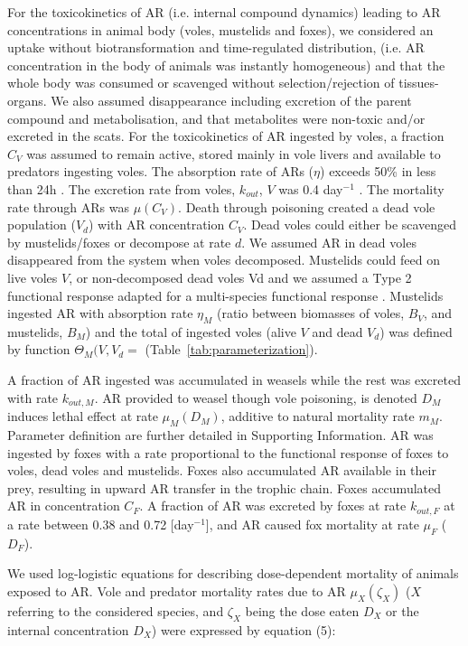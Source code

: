 \documentclass[11pt]{article}
\begin{document}
For the toxicokinetics of AR (i.e. internal compound dynamics) leading to AR concentrations in animal body (voles, mustelids and foxes), we considered an uptake without biotransformation and time-regulated distribution, (i.e. AR concentration in the body of animals was instantly homogeneous) and that the whole body was consumed or scavenged without selection/rejection of tissues-organs. We also assumed disappearance including excretion of the parent compound and metabolisation, and that metabolites were non-toxic and/or excreted in the scats. 
For the toxicokinetics of AR ingested by voles, a fraction $C_V$ was assumed to remain active, stored mainly in vole livers and available to predators ingesting voles. The absorption rate of ARs ($\eta$) exceeds 50\% in less than 24h \citep{Jacquot2013}. The excretion rate from voles, $k_{out}$, $V$ was 0.4 day$^{-1}$ \citep{Sage2008}. The mortality rate through ARs was $\mu(C_V)$. Death through poisoning created a dead vole population ($V_d$) with AR concentration $C_V$. Dead voles could either be scavenged by mustelids/foxes or decompose at rate $d$. We assumed AR in dead voles disappeared from the system when voles decomposed. 
Mustelids could feed on live voles $V$, or non-decomposed dead voles Vd and we assumed a Type 2 functional response adapted for a multi-species functional response \citep{Baudrot2016}. Mustelids ingested AR with absorption rate $\eta_M$ (ratio between biomasses of voles, $B_V$, and mustelids, $B_M$) and the total of ingested voles (alive $V$ and dead $V_d$) was defined by function $\Theta_M (V,V_d=$ (Table~\ref{tab:parameterization}).

A fraction of AR ingested was accumulated in weasels while the rest was excreted with rate $k_{out,M}$.
%
AR provided to weasel though vole poisoning, is denoted $D_M$ induces lethal effect at rate $\mu_M(D_M)$, additive to natural mortality rate $m_M$. Parameter definition are further detailed in Supporting Information.
%
AR was ingested by foxes with a rate proportional to the functional response of foxes to voles, dead voles and mustelids.
%
Foxes also accumulated AR available in their prey, resulting in upward AR transfer in the trophic chain. Foxes accumulated AR in concentration $C_F$. A fraction of AR was excreted by foxes at rate $k_{out,F}$ at a rate between 0.38 and 0.72 [day$^{-1}$]\citep{Sage2010}, and AR caused fox mortality at rate $\mu_F$ ($D_F$).

We used log-logistic equations for describing dose-dependent mortality of animals exposed to AR. Vole and predator mortality rates due to AR $\mu_X(\zeta_X)$ ($X$ referring to the considered species, and $\zeta_X$ being the dose eaten $D_X$ or the internal concentration $D_X$) were expressed by equation (5):
\end{document}
